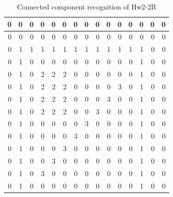 \documentclass[a4paper]{article}
\begin{document}
\begin{table}[h]
	\centering
	\caption{Connected component recognition of Hw2-2B}
	\begin{tabular}{|r|r|r|r|r|r|r|r|r|r|r|r|r|r|r|}
		\hline
		0     & 0     & 0     & 0     & 0     & 0     & 0     & 0     & 0     & 0     & 0     & 0     & 0     & 0     & 0 \bigstrut\\
		\hline
		0     & 0     & 0     & 0     & 0     & 0     & 0     & 0     & 0     & 0     & 0     & 0     & 0     & 0     & 0 \bigstrut\\
		\hline
		0     & 1     & 1     & 1     & 1     & 1     & 1     & 1     & 1     & 1     & 1     & 1     & 1     & 0     & 0 \bigstrut\\
		\hline
		0     & 1     & 0     & 0     & 0     & 0     & 0     & 0     & 0     & 0     & 0     & 0     & 1     & 0     & 0 \bigstrut\\
		\hline
		0     & 1     & 0     & 2     & 2     & 2     & 0     & 0     & 0     & 0     & 0     & 0     & 1     & 0     & 0 \bigstrut\\
		\hline
		0     & 1     & 0     & 2     & 2     & 2     & 0     & 0     & 0     & 0     & 3     & 0     & 1     & 0     & 0 \bigstrut\\
		\hline
		0     & 1     & 0     & 2     & 2     & 2     & 0     & 0     & 0     & 3     & 0     & 0     & 1     & 0     & 0 \bigstrut\\
		\hline
		0     & 1     & 0     & 2     & 2     & 2     & 0     & 0     & 3     & 0     & 0     & 0     & 1     & 0     & 0 \bigstrut\\
		\hline
		0     & 1     & 0     & 0     & 0     & 0     & 0     & 3     & 0     & 0     & 0     & 0     & 1     & 0     & 0 \bigstrut\\
		\hline
		0     & 1     & 0     & 0     & 0     & 0     & 3     & 0     & 0     & 0     & 0     & 0     & 1     & 0     & 0 \bigstrut\\
		\hline
		0     & 1     & 0     & 0     & 0     & 3     & 0     & 0     & 0     & 0     & 0     & 0     & 1     & 0     & 0 \bigstrut\\
		\hline
		0     & 1     & 0     & 0     & 3     & 0     & 0     & 0     & 0     & 0     & 0     & 0     & 1     & 0     & 0 \bigstrut\\
		\hline
		0     & 1     & 0     & 3     & 0     & 0     & 0     & 0     & 0     & 0     & 0     & 0     & 1     & 0     & 0 \bigstrut\\
		\hline
		0     & 1     & 0     & 0     & 0     & 0     & 0     & 0     & 0     & 0     & 0     & 0     & 1     & 0     & 0 \bigstrut\\

\end{tabular}
\end{table}
\end{document}
